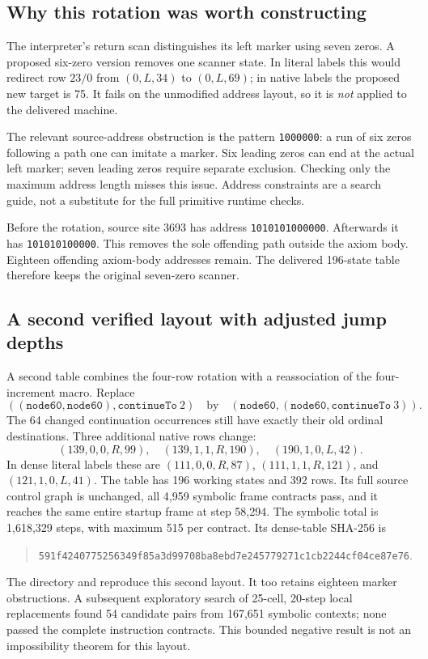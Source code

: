 \subsection{Why this rotation was worth constructing}

The interpreter's return scan distinguishes its left marker using seven
zeros. A proposed six-zero version removes one scanner state. In literal
labels this would redirect row $23/0$ from $(0,L,34)$ to $(0,L,69)$;
in native labels the proposed new target is 75. It fails on the unmodified
address layout, so it is \emph{not} applied to the delivered machine.

The relevant source-address obstruction is the pattern \texttt{1000000}:
a run of six zeros following a path one can imitate a marker. Six leading
zeros can end at the actual left marker; seven leading zeros require
separate exclusion. Checking only the maximum address length misses this
issue. Address constraints are a search guide, not a substitute for the
full primitive runtime checks.

Before the rotation, source site 3693 has address
\texttt{1010101000000}. Afterwards it has
\texttt{101010100000}. This removes the sole offending path outside the
axiom body. Eighteen offending axiom-body addresses remain. The delivered
196-state table therefore keeps the original seven-zero scanner.


\subsection{A second verified layout with adjusted jump depths}

A second table combines the four-row rotation with a reassociation of the
four-increment macro. Replace
\[
 ((\texttt{node60},\texttt{node60}),\texttt{continueTo}\ 2)
 \quad\text{by}\quad
 (\texttt{node60},(\texttt{node60},\texttt{continueTo}\ 3)).
\]
The 64 changed continuation occurrences still have exactly their old ordinal
destinations. Three additional native rows change:
\[
 (139,0,0,R,99),\quad(139,1,1,R,190),\quad(190,1,0,L,42).
\]
In dense literal labels these are
$(111,0,0,R,87)$, $(111,1,1,R,121)$, and $(121,1,0,L,41)$.
The table has 196 working states and 392 rows. Its full source control graph
is unchanged, all 4,959 symbolic frame contracts pass, and it reaches the
same entire startup frame at step 58,294. The symbolic total is 1,618,329
steps, with maximum 515 per contract. Its dense-table SHA-256 is
\begin{quote}\small
\nolinkurl{591f4240775256349f85a3d99708ba8ebd7e245779271c1cb2244cf04ce87e76}.
\end{quote}
The directory  and
 reproduce this second layout. It too
retains eighteen marker obstructions. A subsequent exploratory search of
25-cell, 20-step local replacements found 54 candidate pairs from 167,651
symbolic contexts; none passed the complete instruction contracts. This
bounded negative result is not an impossibility theorem for this layout.

